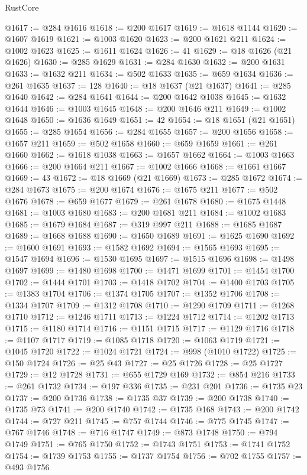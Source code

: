 \begin{lexlean}{RustCore}
\begin{coremodule}
@1617 := @284 @1616
@1618 := @200 @1617
@1619 := @1618 @1144
@1620 := @1607 @1619
@1621 := @1003 @1620
@1623 := @200 @1621 @211
@1624 := @1002 @1623
@1625 := @1611 @1624
@1626 := 41
@1629 := @18 @1626 (@21 @1626)
@1630 := @285 @1629
@1631 := @284 @1630
@1632 := @200 @1631
@1633 := @1632 @211
@1634 := @502 @1633
@1635 := @659 @1634
@1636 := @261 @1635
@1637 := 128
@1640 := @18 @1637 (@21 @1637)
@1641 := @285 @1640
@1642 := @284 @1641
@1644 := @200 @1642 @1038
@1645 := @1632 @1644
@1646 := @1003 @1645
@1648 := @200 @1646 @211
@1649 := @1002 @1648
@1650 := @1636 @1649
@1651 := 42
@1654 := @18 @1651 (@21 @1651)
@1655 := @285 @1654
@1656 := @284 @1655
@1657 := @200 @1656
@1658 := @1657 @211
@1659 := @502 @1658
@1660 := @659 @1659
@1661 := @261 @1660
@1662 := @1618 @1038
@1663 := @1657 @1662
@1664 := @1003 @1663
@1666 := @200 @1664 @211
@1667 := @1002 @1666
@1668 := @1661 @1667
@1669 := 43
@1672 := @18 @1669 (@21 @1669)
@1673 := @285 @1672
@1674 := @284 @1673
@1675 := @200 @1674
@1676 := @1675 @211
@1677 := @502 @1676
@1678 := @659 @1677
@1679 := @261 @1678
@1680 := @1675 @1448
@1681 := @1003 @1680
@1683 := @200 @1681 @211
@1684 := @1002 @1683
@1685 := @1679 @1684
@1687 := @319 @997 @211
@1688 := @1685 @1687
@1689 := @1668 @1688
@1690 := @1650 @1689
@1691 := @1625 @1690
@1692 := @1600 @1691
@1693 := @1582 @1692
@1694 := @1565 @1693
@1695 := @1547 @1694
@1696 := @1530 @1695
@1697 := @1515 @1696
@1698 := @1498 @1697
@1699 := @1480 @1698
@1700 := @1471 @1699
@1701 := @1454 @1700
@1702 := @1444 @1701
@1703 := @1418 @1702
@1704 := @1400 @1703
@1705 := @1383 @1704
@1706 := @1374 @1705
@1707 := @1352 @1706
@1708 := @1334 @1707
@1709 := @1312 @1708
@1710 := @1290 @1709
@1711 := @1268 @1710
@1712 := @1246 @1711
@1713 := @1224 @1712
@1714 := @1202 @1713
@1715 := @1180 @1714
@1716 := @1151 @1715
@1717 := @1129 @1716
@1718 := @1107 @1717
@1719 := @1085 @1718
@1720 := @1063 @1719
@1721 := @1045 @1720
@1722 := @1024 @1721
@1724 := @998 (@1010 @1722)
@1725 := @150 @1724
@1726 := @25 @43
@1727 := @25 @1726
@1728 := @25 @1727
@1729 := @12 @1728
@1731 := @655 @1729 @169
@1732 := @854 @216
@1733 := @261 @1732
@1734 := @197 @336
@1735 := @231 @201
@1736 := @1735 @23
@1737 := @200 @1736
@1738 := @1735 @37
@1739 := @200 @1738
@1740 := @1735 @73
@1741 := @200 @1740
@1742 := @1735 @168
@1743 := @200 @1742
@1744 := @727 @211
@1745 := @757 @1744
@1746 := @775 @1745
@1747 := @767 @1746
@1748 := @716 @1747
@1749 := @873 @1748
@1750 := @794 @1749
@1751 := @765 @1750
@1752 := @1743 @1751
@1753 := @1741 @1752
@1754 := @1739 @1753
@1755 := @1737 @1754
@1756 := @702 @1755
@1757 := @493 @1756

\end{coremodule}
\end{lexlean}
